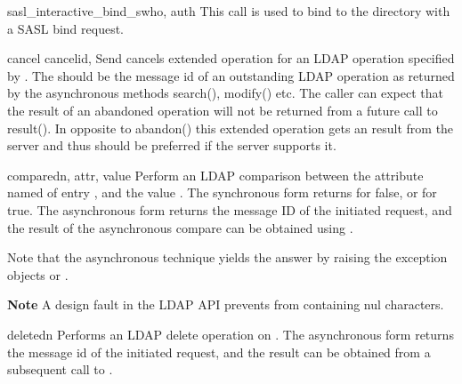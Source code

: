 
\begin{methoddesc}[None]{sasl_interactive_bind_s}{who, auth} %
This call is used to bind to the directory with a SASL bind request.
\end{methoddesc}

\begin{methoddesc}[LDAPObject]{cancel}{
        cancelid,
        }
  Send cancels extended operation for an LDAP operation specified by .
  The  should be the message id of an outstanding LDAP operation as returned
  by the asynchronous methods search(), modify() etc.  The caller
  can expect that the result of an abandoned operation will not be
  returned from a future call to result().
  In opposite to abandon() this extended operation gets an result from
  the server and thus should be preferred if the server supports it.
\end{methoddesc}



\begin{methoddesc}[LDAPObject]{compare}{dn, attr, value} %
Perform an LDAP comparison between the attribute named  of 
entry , and the value . The synchronous form
returns  for false, or  for true.
The asynchronous form returns the message ID of the initiated request, 
and the result of the asynchronous compare can be obtained using 
.  

Note that the asynchronous technique yields the answer
by raising the exception objects  or
.

\textbf{Note} A design fault in the LDAP API prevents  
from containing nul characters.
\end{methoddesc}


\begin{methoddesc}[LDAPObject]{delete}{dn} %
Performs an LDAP delete operation on . The asynchronous form
returns the message id of the initiated request, and the result can be obtained
from a subsequent call to .
\end{methoddesc}

